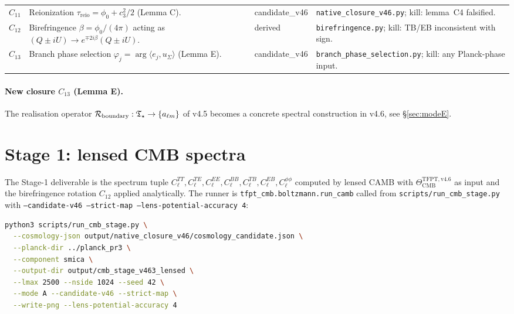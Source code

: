 \documentclass[11pt,a4paper]{article}
\begin{document}
\begin{center}
\begin{tabularx}{\textwidth}{@{}p{}p{}p{}Y@{}}
\(C_{11}\) & Reionization \(\tau_{\mathrm{reio}}=\phi_0+c_3^2/2\) (Lemma C). & \textsf{candidate\_v46} & \texttt{native\_closure\_v46.py}; kill: lemma~C4 falsified. \\
\(C_{12}\) & Birefringence \(\beta=\phi_0/(4\pi)\) acting as \((Q\pm iU)\to e^{\mp 2i\beta}(Q\pm iU)\). & derived & \texttt{birefringence.py}; kill: TB/EB inconsistent with sign. \\
\midrule
\(C_{13}\) & Branch phase selection \(\varphi_j=\arg\langle e_j,u_\Sigma\rangle\) (Lemma E). & \textsf{candidate\_v46} & \texttt{branch\_phase\_selection.py}; kill: any Planck-phase input. \\
\bottomrule
\end{tabularx}
\end{center}

\paragraph{New closure \(C_{13}\) (Lemma E).} The realisation operator
\(\mathcal R_{\mathrm{boundary}}:\mathfrak T_{\star}\to\{a_{\ell m}\}\) of v4.5
becomes a concrete spectral construction in v4.6, see
\S\ref{sec:modeE}.

\section{Stage 1: lensed CMB spectra}
\label{sec:stage1}

The Stage-1 deliverable is the spectrum tuple
\(C_\ell^{TT}, C_\ell^{TE}, C_\ell^{EE}, C_\ell^{BB},
C_\ell^{TB}, C_\ell^{EB}, C_\ell^{\phi\phi}\) computed by lensed CAMB
with \(\Theta_{\mathrm{CMB}}^{\mathrm{TFPT,v4.6}}\) as input and the
birefringence rotation \(C_{12}\) applied analytically.  The runner is
\texttt{tfpt\_cmb.boltzmann.run\_camb} called from
\texttt{scripts/run\_cmb\_stage.py} with
\texttt{--candidate-v46\,--strict-map\,--lens-potential-accuracy\,4}:

\begin{lstlisting}[language=bash]
python3 scripts/run_cmb_stage.py \
  --cosmology-json output/native_closure_v46/cosmology_candidate.json \
  --planck-dir ../planck_pr3 \
  --component smica \
  --output-dir output/cmb_stage_v463_lensed \
  --lmax 2500 --nside 1024 --seed 42 \
  --mode A --candidate-v46 --strict-map \
  --write-png --lens-potential-accuracy 4
\end{lstlisting}
\end{document}
